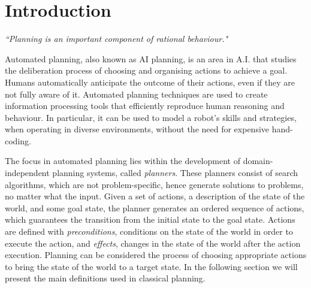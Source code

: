 \section{Introduction}
\begin{center}
\textit{``Planning is an important component of rational behaviour." }\\ \cite{ghallab2004automated}
\end{center}


Automated planning, also known as AI planning, is an area in A.I. that studies the deliberation process of choosing and organising actions to achieve a goal. 
Humans automatically anticipate the outcome of their actions, even if they are not fully aware of it. 
Automated planning techniques are used to create information processing tools that efficiently reproduce human reasoning and behaviour. 
In particular, it can be used to model a robot's skills and strategies, when operating in diverse environments, without the need for expensive hand-coding.

The focus in automated planning lies within the development of {domain-independent} planning systems, called \textit{planners}.
These planners consist of search algorithms, which are not problem-specific, hence generate solutions to problems, no matter what the input. 
Given a set of actions, a description of the state of the world, and some goal state, the planner generates an ordered sequence of actions, which guarantees the transition from the initial state to the goal state. 
Actions are defined with \textit{preconditions}, \ie conditions on the state of the world in order to execute the action, and \textit{effects}, \ie changes in the state of the world after the action execution.
Planning can be considered the process of choosing appropriate actions to bring the state of the world to a target state.
In the following section we will present the main definitions used in classical planning.

